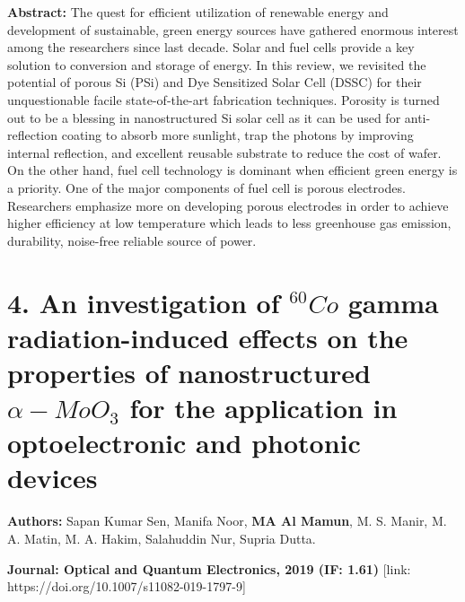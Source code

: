 \documentclass[a4paper,20pt]{article}
\begin{document}
    \begin{minipage}{.98\linewidth} \begin{flushleft}
    
    		\textbf{Abstract:} The quest for efficient utilization of renewable energy and development of sustainable, green energy sources have gathered enormous interest among the researchers since last decade. Solar and fuel cells provide a key solution to conversion and storage of energy. In this review, we revisited the potential of porous Si (PSi) and Dye Sensitized Solar Cell (DSSC) for their unquestionable facile state-of-the-art fabrication techniques. Porosity is turned out to be a blessing in nanostructured Si solar cell as it can be used for anti-reflection coating to absorb more sunlight, trap the photons by improving internal reflection, and excellent reusable substrate to reduce the cost of wafer. On the other hand, fuel cell technology is dominant when efficient green energy is a priority. One of the major components of fuel cell is porous electrodes. Researchers emphasize more on developing porous electrodes in order to achieve higher efficiency at low temperature which leads to less greenhouse gas emission, durability, noise-free reliable source of power.
    	\end{flushleft} \end{minipage}

\vspace{5pt}

\section{\textbf{4. An investigation of $^{60}Co$ gamma radiation-induced effects on the properties of nanostructured $\alpha-MoO_{3}$ for the application in optoelectronic and photonic devices}}

\textbf{Authors:} Sapan Kumar Sen, Manifa Noor, \textbf{MA Al Mamun}, M. S. Manir, M. A. Matin, M. A. Hakim, Salahuddin Nur, Supria Dutta. \\ \vspace{3pt}

\textbf{Journal: Optical and Quantum Electronics, 2019 (IF: 1.61)} [link: https://doi.org/10.1007/s11082-019-1797-9] \\ \vspace{5pt}
\end{document}

